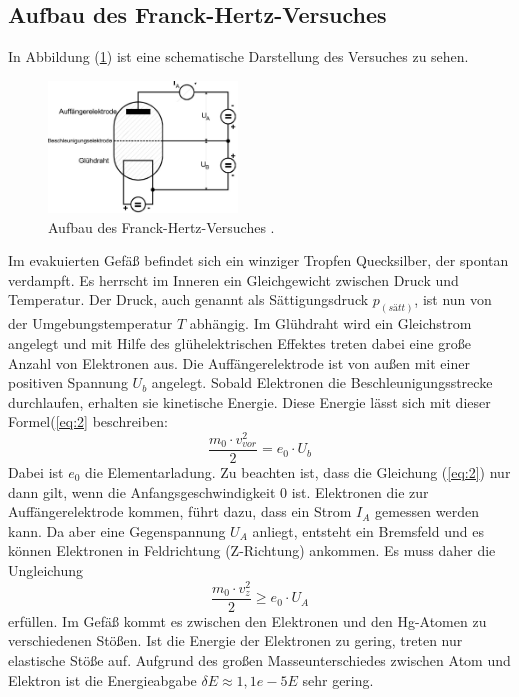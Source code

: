 \subsection{Aufbau des Franck-Hertz-Versuches}
In Abbildung (\ref{abb:1}) ist eine schematische Darstellung des Versuches zu sehen.
\begin{figure}[H]
\centering
\includegraphics[width =5 cm, height = 3.5cm]{Aufbau.jpg}
\caption{Aufbau des Franck-Hertz-Versuches \cite{1}.}
\label{abb:1}
\end{figure}
Im evakuierten Gefäß befindet sich ein winziger Tropfen Quecksilber, der spontan verdampft. Es herrscht im Inneren ein
Gleichgewicht zwischen Druck und Temperatur. Der Druck, auch genannt als Sättigungsdruck $p_(sätt)$, ist nun
von der Umgebungstemperatur $T$ abhängig.
Im Glühdraht wird ein Gleichstrom angelegt und mit Hilfe des glühelektrischen Effektes treten dabei eine große Anzahl von
Elektronen aus. Die Auffängerelektrode ist von außen mit einer positiven Spannung $U_b$ angelegt.
Sobald Elektronen die Beschleunigungsstrecke durchlaufen, erhalten sie kinetische Energie.
Diese Energie lässt sich mit dieser Formel(\ref{eq:2} beschreiben:
\begin{equation}
  \frac{m_0 \cdot v_{vor}^2} {2} = e_0 \cdot U_b
  \label{eq:2}
\end{equation}
Dabei ist $e_0$ die Elementarladung. Zu beachten ist, dass die Gleichung (\ref{eq:2}) nur dann gilt, wenn
die Anfangsgeschwindigkeit $0$ ist.
Elektronen die zur Auffängerelektrode kommen, führt dazu, dass ein Strom $I_A$ gemessen werden kann.
Da aber eine Gegenspannung $U_A$ anliegt, entsteht ein Bremsfeld und es können Elektronen in Feldrichtung (Z-Richtung) ankommen.
Es muss daher die Ungleichung
\begin{equation*}
  \frac{m_0 \cdot v_{z}^2} {2} \geq e_0 \cdot U_A
\end{equation*}
erfüllen.
Im Gefäß kommt es zwischen den Elektronen und den Hg-Atomen zu verschiedenen Stößen.
Ist die Energie der Elektronen zu gering, treten nur elastische Stöße auf. Aufgrund des großen
Masseunterschiedes zwischen Atom und Elektron ist die Energieabgabe $\delta E \approx  1,1e-5 E$
sehr gering.
